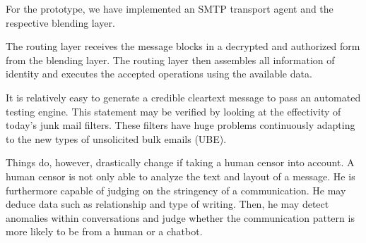 \documentclass[acmsmall, screen]{acmart}
\begin{document}
For the prototype, we have implemented an SMTP transport agent and the respective blending layer.

The routing layer receives the message blocks in a decrypted and authorized form from the blending layer. The routing layer then assembles all information of identity and executes the accepted operations using the available data. 

It is relatively easy to generate a credible cleartext message to pass an automated testing engine. This statement may be verified by looking at the effectivity of today's junk mail filters. These filters have huge problems continuously adapting to the new types of unsolicited bulk emails (UBE).

Things do, however, drastically change if taking a human censor into account. A human censor is not only able to analyze the text and layout of a message. He is furthermore capable of judging on the stringency of a communication. He may deduce data such as relationship and type of writing. Then, he may detect anomalies within conversations and judge whether the communication pattern is more likely to be from a human or a chatbot.
\end{document}
